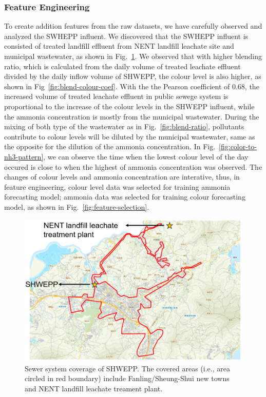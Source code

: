 \subsubsection{Feature Engineering}
To create addition features from the raw datasets, we have carefully observed and analyzed the SWHEPP influent. We discovered that the SWHEPP influent is consisted of treated landfill effluent from NENT landfill leachate site and municipal wastewater, as shown in Fig.~\ref{fig:geomap}. We observed that with higher blending ratio, which is calculated from the daily volume of treated leachate effluent divided by the daily inflow volume of SHWEPP, the colour level is also higher, as shown in Fig~\ref{fig:blend-colour-coef}. With the the Pearson coefficient of 0.68, the increased volume of treated leachate effluent in public sewege system is proportional to the increase of the colour levels in the SHWEPP influent, while the ammonia concentration is mostly from the municipal wastewater. During the mixing of both type of the wastewater as in Fig.~\ref{fig:blend-ratio}, pollutants contribute to colour levels will be diluted by the municipal wastewater, same as the opposite for the dilution of the ammonia concentration. In Fig.~\ref{fig:color-to-nh3-pattern}, we can observe the time when the lowest colour level of the day occured is close to when the highest of ammonia concentration was observed. The changes of colour levels and ammonia concentration are interative, thus, in feature engineering, colour level data was selected for training ammonia forecasting model; ammonia data was selected for training colour forecasting model, as shown in Fig.~\ref{fig:feature-selection}.

\begin{figure}[h]
    \centering
    \includegraphics[width=0.95\columnwidth]{imgs/pre-processing/geomap.png}
    \caption{Sewer system coverage of SHWEPP. The covered areas (i.e., area circled in red boundary) include Fanling/Sheung-Shui new towns and NENT landfill leachate treament plant.}
    \label{fig:geomap}
 \end{figure}

